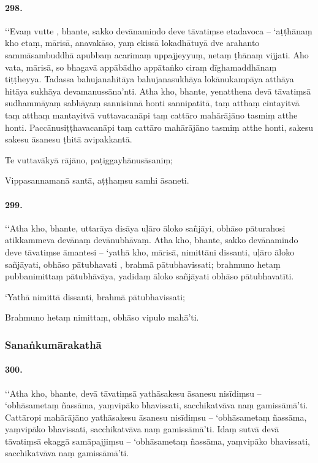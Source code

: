 \paragraph{298.} ‘‘Evaṃ vutte , bhante, sakko devānamindo deve tāvatiṃse etadavoca – ‘aṭṭhānaṃ kho etaṃ, mārisā, anavakāso, yaṃ ekissā lokadhātuyā dve arahanto sammāsambuddhā apubbaṃ acarimaṃ uppajjeyyuṃ, netaṃ ṭhānaṃ vijjati. Aho vata, mārisā, so bhagavā appābādho appātaṅko ciraṃ dīghamaddhānaṃ tiṭṭheyya. Tadassa bahujanahitāya bahujanasukhāya lokānukampāya atthāya hitāya sukhāya devamanussāna’nti. Atha kho, bhante, yenatthena devā tāvatiṃsā sudhammāyaṃ sabhāyaṃ sannisinnā honti sannipatitā, taṃ atthaṃ cintayitvā taṃ atthaṃ mantayitvā vuttavacanāpi taṃ cattāro mahārājāno tasmiṃ atthe honti. Paccānusiṭṭhavacanāpi taṃ cattāro mahārājāno tasmiṃ atthe honti, sakesu sakesu āsanesu ṭhitā avipakkantā.

Te vuttavākyā rājāno, paṭiggayhānusāsaniṃ;

Vippasannamanā santā, aṭṭhaṃsu samhi āsaneti.

\paragraph{299.} ‘‘Atha kho, bhante, uttarāya disāya uḷāro āloko sañjāyi, obhāso pāturahosi atikkammeva devānaṃ devānubhāvaṃ. Atha kho, bhante, sakko devānamindo deve tāvatiṃse āmantesi – ‘yathā kho, mārisā, nimittāni dissanti, uḷāro āloko sañjāyati, obhāso pātubhavati , brahmā pātubhavissati; brahmuno hetaṃ pubbanimittaṃ pātubhāvāya, yadidaṃ āloko sañjāyati obhāso pātubhavatīti.

‘Yathā nimittā dissanti, brahmā pātubhavissati;

Brahmuno hetaṃ nimittaṃ, obhāso vipulo mahā’ti.

\subsubsection{Sanaṅkumārakathā}

\paragraph{300.} ‘‘Atha kho, bhante, devā tāvatiṃsā yathāsakesu āsanesu nisīdiṃsu – ‘obhāsametaṃ ñassāma, yaṃvipāko bhavissati, sacchikatvāva naṃ gamissāmā’ti. Cattāropi mahārājāno yathāsakesu āsanesu nisīdiṃsu – ‘obhāsametaṃ ñassāma, yaṃvipāko bhavissati, sacchikatvāva naṃ gamissāmā’ti. Idaṃ sutvā devā tāvatiṃsā ekaggā samāpajjiṃsu – ‘obhāsametaṃ ñassāma, yaṃvipāko bhavissati, sacchikatvāva naṃ gamissāmā’ti.

